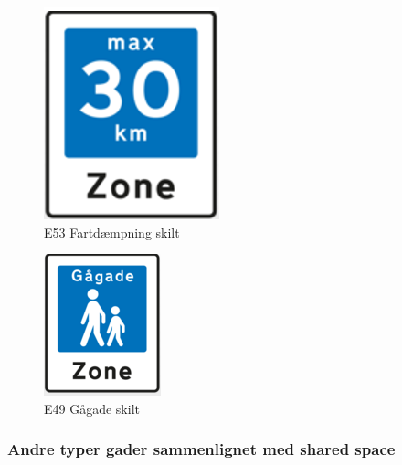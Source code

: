 \begin{figure}[htbp]
  \centering
  \begin{adjustbox}{max width=\textwidth}
    \includegraphics[scale=0.5]{figures/Billederogfigur/Indledningen/E53.png}
 \end{adjustbox}
  \caption{E53 Fartdæmpning skilt \autocite{e49}}
    \label{fig:fartdaempning}
\end{figure}

\begin{figure}[htbp]
  \centering
  \begin{adjustbox}{max width=\textwidth}
    \includegraphics{figures/Billederogfigur/Indledningen/E49.png}
 \end{adjustbox}
  \caption{E49 Gågade skilt \autocite{e49}}
    \label{fig:gaagadeskilt}
\end{figure}



\subsubsection{Andre typer gader sammenlignet med shared space}
\label{subs:andre_typer_gader_sammenlignet_med_shared_space}


